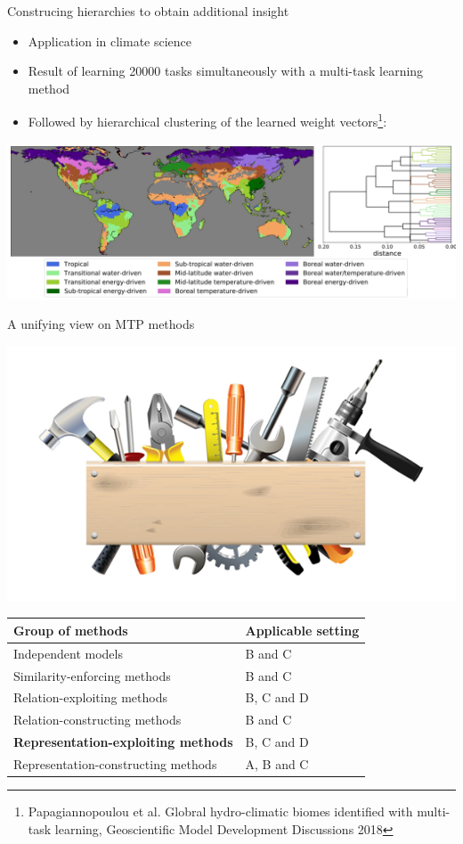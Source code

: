 \documentclass[]{beamer}
\renewcommand{\alert}[1]{\textbf{\color{putblue} #1}}
\begin{document}
\begin{frame}{Construcing hierarchies to obtain additional insight}

\begin{itemize}
\item Application in climate science
\item Result of learning 20000 tasks simultaneously with a multi-task learning method
\item Followed by hierarchical clustering of the learned weight vectors\footnote{Papagiannopoulou et al. Globral hydro-climatic biomes identified with multi-task learning, Geoscientific Model Development Discussions 2018}:
\end{itemize}
\begin{center}
\includegraphics[scale=0.2]{Figures/biomes} 
\end{center}

\end{frame}


\begin{frame}{A unifying view on MTP methods}

\begin{center}
\includegraphics[scale=0.3]{pics/tools}

\begin{tabular}{ll}
\hline
Group of methods & Applicable setting \\
\hline
\hline
Independent models & B and C \\
Similarity-enforcing methods & B and C   \\ 
Relation-exploiting methods & B, C and D  \\
Relation-constructing methods & B and C \\
\alert{Representation-exploiting methods} & B, C and D \\
Representation-constructing methods & A, B and C \\
\hline  
\end{tabular}
\end{center}
\end{frame}
\end{document}
